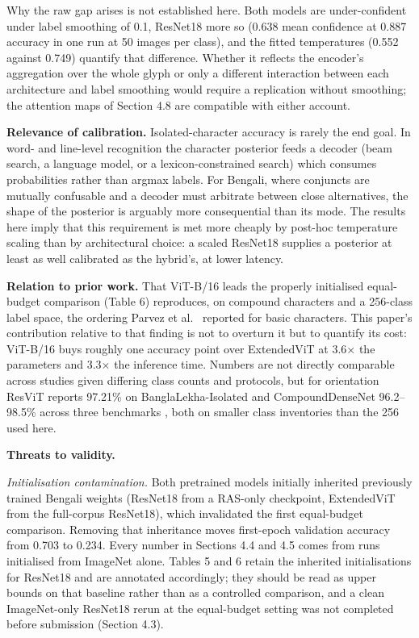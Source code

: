 Why the raw gap arises is not established here. Both models are under-confident under label smoothing of 0.1, ResNet18 more so (0.638 mean confidence at 0.887 accuracy in one run at 50 images per class), and the fitted temperatures (0.552 against 0.749) quantify that difference. Whether it reflects the encoder's aggregation over the whole glyph or only a different interaction between each architecture and label smoothing would require a replication without smoothing; the attention maps of Section 4.8 are compatible with either account.

\textbf{Relevance of calibration.} Isolated-character accuracy is
rarely the end goal. In word- and line-level recognition the character
posterior feeds a decoder (beam search, a language model, or a
lexicon-constrained search) which consumes probabilities rather than argmax labels. For Bengali, where conjuncts are mutually confusable and a decoder must arbitrate between close alternatives, the shape of the posterior is arguably more consequential than its mode. The results here imply that this requirement is met more cheaply by post-hoc temperature scaling than by architectural choice: a scaled ResNet18 supplies a posterior at least as well calibrated as the hybrid's, at lower latency.

\textbf{Relation to prior work.} That ViT-B/16 leads the properly
initialised equal-budget comparison (Table 6) reproduces, on compound
characters and a 256-class label space, the ordering Parvez et
al.~\citeyearpar{ref17} reported for basic characters. This paper's contribution relative to
that finding is not to overturn it but to quantify its cost: ViT-B/16
buys roughly one accuracy point over ExtendedViT at 3.6× the parameters
and 3.3× the inference time. Numbers are not directly comparable across
studies given differing class counts and protocols, but for orientation
ResViT reports 97.21\% on BanglaLekha-Isolated \citep{ref19} and
CompoundDenseNet 96.2--98.5\% across three benchmarks \citep{ref23}, both on
smaller class inventories than the 256 used here.

\textbf{Threats to validity.}

\emph{Initialisation contamination.} Both pretrained models initially inherited previously trained Bengali weights (ResNet18 from a
RAS-only checkpoint, ExtendedViT from the full-corpus ResNet18), which
invalidated the first equal-budget comparison. Removing that inheritance
moves first-epoch validation accuracy from 0.703 to 0.234. Every number
in Sections 4.4 and 4.5 comes from runs initialised from ImageNet alone.
Tables 5 and 6 retain the inherited initialisations for ResNet18 and are
annotated accordingly; they should be read as upper bounds on that
baseline rather than as a controlled comparison, and a clean
ImageNet-only ResNet18 rerun at the equal-budget setting was not
completed before submission (Section 4.3).

